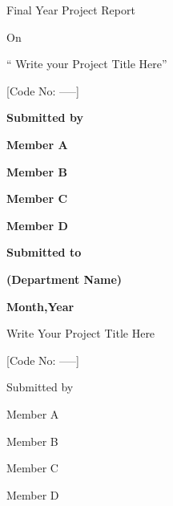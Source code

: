 \documentclass[a4paper, 12pt ]{report}
\begin{document}
	\large
	{
		\vspace*{\baselineskip}
		{\bf
			\begin{center}Final Year Project Report\end{center}
			\begin{center}On \end{center}
			\begin{center}`` Write your Project Title Here'' \end{center}
			\begin{center}[Code No: -----]\end{center}
		}
	}
	\vspace*{\baselineskip}
	\large\begin{center}\bf{Submitted by}\end{center}
	\large\begin{center}\bf{Member A}\end{center}
	\large\begin{center}\bf{Member B}\end{center}
	\large\begin{center}\bf{Member C}\end{center}
	\large\begin{center}\bf{Member D}\end{center}
	
	\vspace*{\baselineskip}
	\large\begin{center}\bf{Submitted to}\end{center}
	\large\begin{center}\bf{(Department Name)}\end{center}
	\large\begin{center}\bf{Month,Year}\end{center}
	
	\newpage
	
		\large
	{
		{\bf
			\begin{center}Write Your Project Title Here\end{center}
		}
		\begin{center}[Code No: -----]\end{center}
	}
	\vspace*{\baselineskip}
	
	\large\begin{center}Submitted by\end{center}
	\large\begin{center}Member A\end{center}
	\large\begin{center}Member B\end{center}
	\large\begin{center}Member C\end{center}
	\large\begin{center}Member D\end{center}
	\vspace*{\baselineskip}
	
\end{document}
